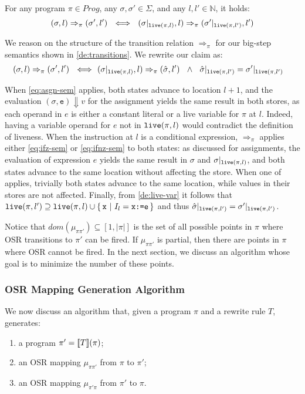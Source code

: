 \begin{lemma}
\label{le:only-live-count}
For any program $\pi\in Prog$, any $\sigma,\sigma'\in\Sigma$, and any $l,l'\in \mathbb{N}$, it holds: 
$$
(\sigma,l)\Rightarrow_{\pi}(\sigma',l') ~~ \Longleftrightarrow ~~ (\sigma\vert_{\text{${\tt live}$}(\pi,l)},l)\Rightarrow_{\pi}(\sigma'\vert_{\text{${\tt live}$}(\pi,l')},l')
$$
\end{lemma}

\begin{myproof}
We reason on the structure of the transition relation $\Rightarrow_{\pi}$ for our big-step semantics shown in \ref{de:transitions}. We rewrite our claim as:
\begin{align*}
(\sigma,l)\Rightarrow_{\pi}(\sigma',l') ~~ \Longleftrightarrow ~~ & (\sigma\vert_{\text{${\tt live}$}(\pi,l)},l)\Rightarrow_{\pi}(\hat{\sigma},l') ~~
\wedge ~~ \hat{\sigma}\vert_{\text{${\tt live}$}(\pi,l')} = \sigma'\vert_{\text{${\tt live}$}(\pi,l')} 
\end{align*}

\noindent When \ref{eq:asgn-sem} applies, both states advance to location $l+1$, and the evaluation $(\sigma, \texttt{e}) \Downarrow v$ for the assignment yields the same result in both stores, as each operand in $e$ is either a constant literal or a live variable for $\pi$ at $l$. Indeed, having a variable operand for $e$ not in $\text{${\tt live}$}(\pi,l)$ would contradict the definition of liveness. When the instruction at $l$ is a conditional expression, $\Rightarrow_{\pi}$ applies either \ref{eq:ifz-sem} or \ref{eq:ifnz-sem} to both states: as discussed for assignments, the evaluation of expression $e$ yields the same result in $\sigma$ and $\sigma\vert_{\text{${\tt live}$}(\pi,l)}$, and both states advance to the same location without affecting the store. When one of  applies, trivially both states advance to the same location, while values in their stores are not affected. Finally, from \ref{de:live-var} it follows that $\text{${\tt live}$}(\pi,l')\supseteq\text{${\tt live}$}(\pi,l)\cup\{\,\texttt{x} ~ | ~ I_l=\texttt{x:=e}\,\}$ and thus $\hat{\sigma}\vert_{\text{${\tt live}$}(\pi,l')} = \sigma'\vert_{\text{${\tt live}$}(\pi,l')}$.
\end{myproof}

\noindent Notice that $dom(\mu_{\pi\pi'})\subseteq [1,|\pi|]$ is the set of all possible points in $\pi$ where OSR transitions to $\pi'$ can be fired. If $\mu_{\pi\pi'}$ is partial, then there are points in $\pi$ where OSR cannot be fired. In the next section, we discuss an algorithm whose goal is to minimize the number of these points.


\subsubsection{OSR Mapping Generation Algorithm}
\label{ss:osr-mapping-algorithms}
We now discuss an algorithm that, given a program $\pi$ and a rewrite rule $T$, generates:
\begin{enumerate}[itemsep=0pt,parsep=3pt]
 \item a program $\pi'=[\![T]\!](\pi)$;
 \item an OSR mapping $\mu_{\pi\pi'}$ from $\pi$ to $\pi'$;
 \item an OSR mapping $\mu_{\pi'\pi}$ from $\pi'$ to $\pi$.
\end{enumerate}

